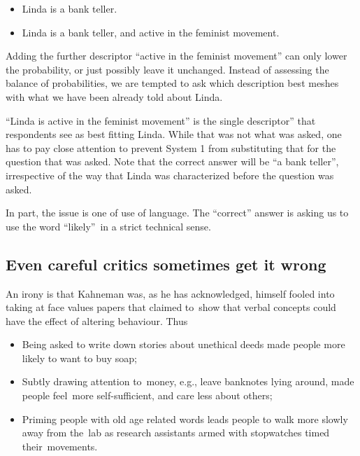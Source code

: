 \documentclass[
  10pt,
  b5paper]{book}
\providecommand{\tightlist}{%
  \setlength{\itemsep}{0pt}\setlength{\parskip}{0pt}}
\begin{document}
\begin{itemize}
\tightlist
\item
  Linda is a bank teller.
\item
  Linda is a bank teller, and active in the feminist movement.
\end{itemize}

Adding the further descriptor ``active in the feminist movement'' can only lower the probability, or just possibly leave it unchanged. Instead of assessing the balance of probabilities, we are tempted to ask which description best meshes with what we have been already told about Linda.

``Linda is active in the feminist movement'' is the single descriptor'' that respondents see as best fitting Linda. While that was not what was asked, one has to pay close attention to prevent System 1 from substituting that for the question that was asked. Note that the correct answer will be ``a bank teller'', irrespective of the way that Linda was characterized before the question was asked.

In part, the issue is one of use of language. The ``correct'' answer is asking us to use the word ``likely''~in a strict technical sense.

\hypertarget{even-careful-critics-sometimes-get-it-wrong}{%
\subsection*{Even careful critics sometimes get it wrong}\label{even-careful-critics-sometimes-get-it-wrong}}

An irony is that Kahneman was, as he has acknowledged, himself fooled into taking at face values papers that claimed to~show that verbal concepts could have the effect of altering behaviour. Thus

\begin{itemize}
\tightlist
\item
  Being asked to write down stories about unethical deeds made people more likely to want to buy soap;
\item
  Subtly drawing attention to~money, e.g., leave banknotes lying around, made people feel~more self-sufficient, and care less about others;
\item
  Priming people with old age related words leads people to walk more slowly away from the~lab as research assistants armed with stopwatches timed their~movements.
\end{itemize}
\end{document}
